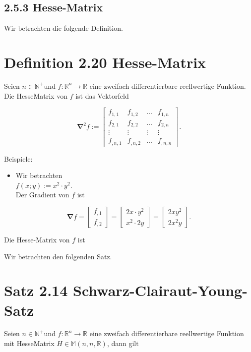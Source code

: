 \documentclass[10pt]{article}
\begin{document}
\subsection*{2.5.3 Hesse-Matrix}
Wir betrachten die folgende Definition.

\section*{Definition 2.20 Hesse-Matrix}
Seien $n \in \mathbb{N}^{+}$und $f: \mathbb{R}^{n} \rightarrow \mathbb{R}$ eine zweifach differentierbare reellwertige Funktion. Die HesseMatrix von $f$ ist das Vektorfeld

\[
\boldsymbol{\nabla}^{2} f:=\left[\begin{array}{cccc}
f_{1,1} & f_{1,2} & \ldots & f_{1, n}  \tag{2.142}\\
f_{2,1} & f_{2,2} & \ldots & f_{2, n} \\
\vdots & \vdots & \vdots & \vdots \\
f_{, n, 1} & f_{, n, 2} & \ldots & f_{, n, n}
\end{array}\right] .
\]

Beispiele:

\begin{itemize}
  \item Wir betrachten\\
$f(x ; y):=x^{2} \cdot y^{2}$.\\
Der Gradient von $f$ ist
\end{itemize}

\[
\boldsymbol{\nabla} f=\left[\begin{array}{l}
f_{, 1}  \tag{2.144}\\
f_{, 2}
\end{array}\right]=\left[\begin{array}{l}
2 x \cdot y^{2} \\
x^{2} \cdot 2 y
\end{array}\right]=\left[\begin{array}{l}
2 x y^{2} \\
2 x^{2} y
\end{array}\right] .
\]

Die Hesse-Matrix von $f$ ist

Wir betrachten den folgenden Satz.

\section*{Satz 2.14 Schwarz-Clairaut-Young-Satz}
Seien $n \in \mathbb{N}^{+}$und $f: \mathbb{R}^{n} \rightarrow \mathbb{R}$ eine zweifach differentierbare reellwertige Funktion mit HesseMatrix $H \in \mathbb{M}(n, n, \mathbb{R})$, dann gilt
\end{document}
